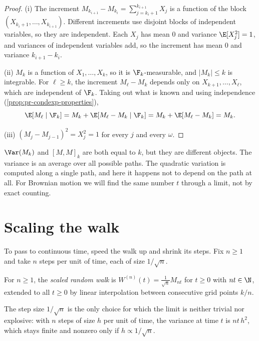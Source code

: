 \begin{proof}
(i) The increment $M_{k_{i+1}}-M_{k_i}=\sum_{j=k_i+1}^{k_{i+1}}X_j$ is a function of the
block $(X_{k_i+1},\dots,X_{k_{i+1}})$. Different increments use disjoint blocks of
independent variables, so they are independent. Each $X_j$ has mean $0$ and variance
$\E[X_j^2]=1$, and variances of independent variables add, so the increment has mean $0$
and variance $k_{i+1}-k_i$.

(ii) $M_k$ is a function of $X_1,\dots,X_k$, so it is $\F_k$-measurable, and $|M_k|\le k$
is integrable. For $\ell\ge k$, the increment $M_\ell-M_k$ depends only on
$X_{k+1},\dots,X_\ell$, which are independent of $\F_k$. Taking out what is known and
using independence (\cref{prop:pr-condexp-properties}),
\[
  \E[M_\ell\mid\F_k]=M_k+\E[M_\ell-M_k\mid\F_k]=M_k+\E[M_\ell-M_k]=M_k .
\]

(iii) $(M_j-M_{j-1})^2=X_j^2=1$ for every $j$ and every $\omega$.
\end{proof}

\begin{remark}
$\Var(M_k)$ and $[M,M]_k$ are both equal to $k$, but they are different objects. The
variance is an average over all possible paths. The quadratic variation is computed
along a single path, and here it happens not to depend on the path at all. For Brownian
motion we will find the same number $t$ through a limit, not by exact counting.
\end{remark}

\section{Scaling the walk}\label{sec:bm-scaling}

To pass to continuous time, speed the walk up and shrink its steps. Fix $n\ge1$ and take
$n$ steps per unit of time, each of size $1/\sqrt n$.

\begin{definition}\label{def:bm-scaled}
For $n\ge1$, the \emph{scaled random walk} is
$W^{(n)}(t)=\frac{1}{\sqrt n}M_{nt}$ for $t\ge0$ with $nt\in\N$, extended to all $t\ge0$
by linear interpolation between consecutive grid points $k/n$.
\end{definition}

The step size $1/\sqrt n$ is the only choice for which the limit is neither trivial nor
explosive: with $n$ steps of size $h$ per unit of time, the variance at time $t$ is
$nt\,h^2$, which stays finite and nonzero only if $h\propto 1/\sqrt n$.

